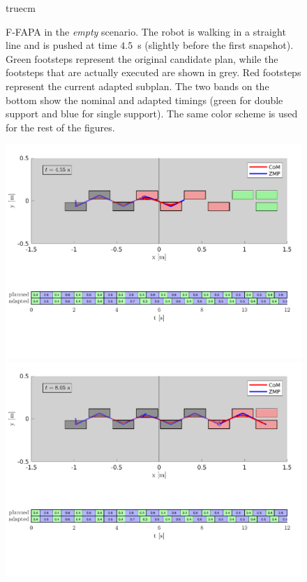 \begin{figure}
    \caption{F-FAPA in the {\em empty} scenario. The robot is walking in a straight line and is pushed at time $4.5$~s (slightly before the first snapshot). Green footsteps represent the original candidate plan, while the footsteps that are actually executed are shown in grey. Red footsteps represent the current adapted subplan. The two bands on the bottom show the nominal and adapted timings (green for double support and blue for single support). The same color scheme is used for the rest of the figures.}
    \label{fig:FAPA:matlab_empty}
     truecm
\end{figure}

\begin{figure}
    \centering
    \includegraphics[trim={0 5.9cm 0 0.7cm},clip,width=\textwidth]{figures/two-patches-fixed-plot-after-push.pdf}
    \includegraphics[trim={0 5.9cm 0 0.7cm},clip,width=\textwidth]{figures/two-patches-fixed-completing-task.pdf}

\end{figure}
